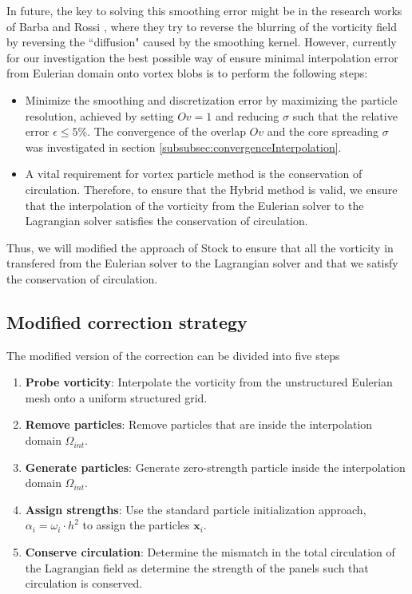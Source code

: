 In future, the key to solving this smoothing error might be in the research works of Barba and Rossi \cite{Barba2010a}, where they try to reverse the blurring of the vorticity field by reversing the ``diffusion" caused by the smoothing kernel. However, currently for our investigation the best possible way of ensure minimal interpolation error from Eulerian domain onto vortex blobs is to perform the following steps:
\begin{itemize}
\item Minimize the smoothing and discretization error by maximizing the particle resolution, achieved by setting $Ov=1$ and reducing $\sigma$ such that the relative error $\epsilon \leqslant 5\%$. The convergence of the overlap $Ov$ and the core spreading $\sigma$ was investigated in section \ref{subsubsec:convergenceInterpolation}.
\item A vital requirement for vortex particle method is the conservation of circulation. Therefore, to ensure that the Hybrid method is valid, we ensure that the interpolation of the vorticity from the Eulerian solver to the Lagrangian solver satisfies the conservation of circulation.
\end{itemize}

Thus, we will modified the approach of Stock \cite{Stock2010a} to ensure that all the vorticity in transfered from the Eulerian solver to the Lagrangian solver and that we satisfy the conservation of circulation.

\subsection{Modified correction strategy}
\label{subsec:mcs}
The modified version of the correction can be divided into five steps
\begin{enumerate}
\item \textbf{Probe vorticity}: Interpolate the vorticity from the unstructured Eulerian mesh onto a uniform structured grid.
\item \textbf{Remove particles}: Remove particles that are inside the interpolation domain $\Omega_{int}$.
\item \textbf{Generate particles}: Generate zero-strength particle inside the interpolation domain $\Omega_{int}$.
\item \textbf{Assign strengths}: Use the standard particle initialization approach, $\alpha_i = \omega_i \cdot h^2$ to assign the particles $\mathbf{x}_i$.
\item \textbf{Conserve circulation}: Determine the mismatch in the total circulation of the Lagrangian field as determine the strength of the panels such that circulation is conserved.
\end{enumerate}

